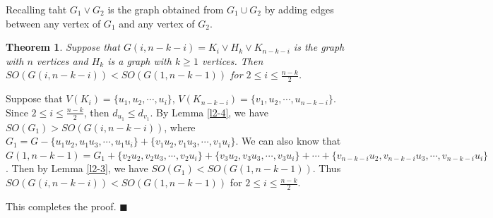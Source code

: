 \documentclass[a4paper,12pt]{article}
\newenvironment{proof}{{\noindent \it Proof.}}{\hfill $\blacksquare$\par}
\newtheorem{theorem}{Theorem}[section]
\begin{document}
Recalling taht $G_{1}\vee G_{2}$ is the graph obtained from $G_{1}\cup G_{2}$ by adding edges between any vertex of $G_{1}$ and any vertex of $G_{2}$.
\begin{theorem}\label{l2-5}
Suppose that $G(i,n-k-i)=K_{i}\vee H_{k}\vee K_{n-k-i}$ is the graph with $n$ vertices and $H_{k}$ is a graph with $k\geq 1$ vertices. Then $SO(G(i,n-k-i))<SO(G(1,n-k-1))$ for $2\leq i\leq \frac{n-k}{2}$.
\end{theorem}
\begin{proof}
Suppose that $V(K_{i})=\{u_{1},u_{2},\cdots,u_{i}\}$, $V(K_{n-k-i})=\{v_{1},u_{2},\cdots,u_{n-k-i}\}$.
Since $2\leq i\leq \frac{n-k}{2}$, then $d_{u_{1}}\leq d_{v_{1}}$. By Lemma \ref{l2-4}, we have
$SO(G_{1})>SO(G(i,n-k-i))$, where $G_{1}=G-\{u_{1}u_{2},u_{1}u_{3},\cdots,u_{1}u_{i}\}+\{v_{1}u_{2},v_{1}u_{3},\cdots,v_{1}u_{i}\}$.
We can also know that $G(1,n-k-1)=G_{1}+\{v_{2}u_{2},v_{2}u_{3},\cdots,v_{2}u_{i}\}+\{v_{3}u_{2},v_{3}u_{3},\cdots,v_{3}u_{i}\}
+\cdots+\{v_{n-k-i}u_{2},v_{n-k-i}u_{3},\cdots,v_{n-k-i}u_{i}\}$. Then by Lemma \ref{l2-3}, we have
$SO(G_{1})<SO(G(1,n-k-1))$. Thus $SO(G(i,n-k-i))<SO(G(1,n-k-1))$ for $2\leq i\leq \frac{n-k}{2}$.

This completes the proof.
\end{proof}
\end{document}
